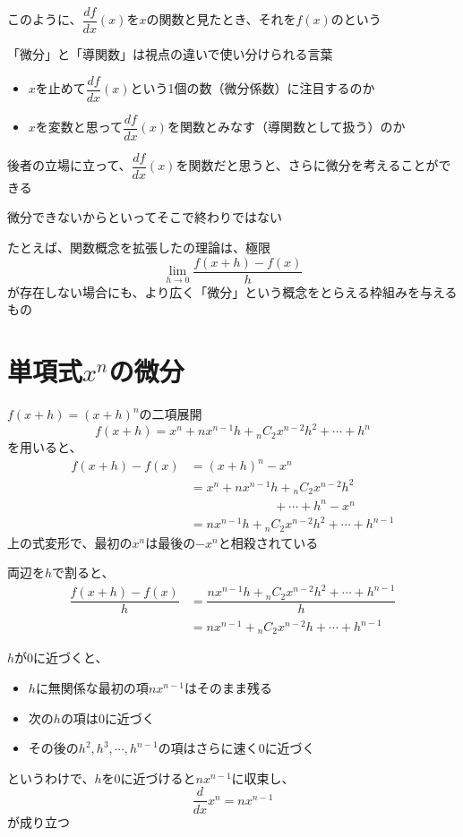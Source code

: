 \documentclass[../book_jiriki_calc]{subfiles}
\begin{document}
\br

このように、$\dfrac{df}{dx}(x)$を$x$の関数と見たとき、それを$f(x)$のという

\sectionline

「微分」と「導関数」は視点の違いで使い分けられる言葉

\begin{itemize}
  \item $x$を止めて$\dfrac{df}{dx}(x)$という1個の数（微分係数）に注目するのか
  \item $x$を変数と思って$\dfrac{df}{dx}(x)$を関数とみなす（導関数として扱う）のか
\end{itemize}

後者の立場に立って、$\dfrac{df}{dx}(x)$を関数だと思うと、さらに微分を考えることができる

\sectionline

微分できないからといってそこで終わりではない

\br

たとえば、関数概念を拡張したの理論は、極限
\begin{equation}
  \lim_{h\to 0}\dfrac{f(x+h)-f(x)}{h}
\end{equation}
が存在しない場合にも、より広く「微分」という概念をとらえる枠組みを与えるもの

\section{単項式$x^n$の微分}

$f(x+h)=(x+h)^n$の二項展開
\begin{equation}
  f(x+h) = x^n + nx^{n-1}h + {}_n C_2 x^{n-2}h^2 + \cdots + h^n
\end{equation}
を用いると、
\begin{align}
  f(x+h)-f(x) & = (x+h)^n - x^n                                      \\
              & = x^n + nx^{n-1}h + {}_n C_2 x^{n-2}h^2              \\
              & \phantom{=====} + \cdots + h^n - x^n                 \\
              & = nx^{n-1}h + {}_n C_2 x^{n-2}h^2 + \cdots + h^{n-1}
\end{align}
上の式変形で、最初の$x^n$は最後の$-x^n$と相殺されている

両辺を$h$で割ると、
\begin{align}
  \dfrac{f(x+h)-f(x)}{h}
   & = \dfrac{nx^{n-1}h + {}_n C_2 x^{n-2}h^2 + \cdots + h^{n-1}}{h} \\
   & = nx^{n-1} + {}_n C_2 x^{n-2}h + \cdots + h^{n-1}
\end{align}

$h$が$0$に近づくと、
\begin{itemize}
  \item $h$に無関係な最初の項$nx^{n-1}$はそのまま残る
  \item 次の$h$の項は$0$に近づく
  \item その後の$h^2, h^3, \cdots, h^{n-1}$の項はさらに速く$0$に近づく
\end{itemize}

というわけで、$h$を$0$に近づけると$nx^{n-1}$に収束し、
\begin{equation}
  \dfrac{d}{dx}x^n = nx^{n-1}
\end{equation}
が成り立つ
\end{document}
